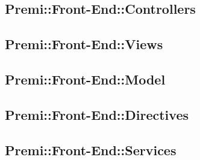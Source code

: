 \subsection{Premi::Front-End::Controllers}

\newpage

\subsection{Premi::Front-End::Views}

\newpage

\subsection{Premi::Front-End::Model}

\newpage

\subsection{Premi::Front-End::Directives}

\newpage

\subsection{Premi::Front-End::Services}

\newpage